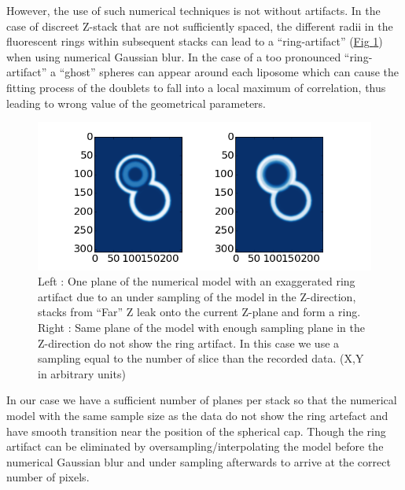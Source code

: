 \documentclass[A4paperpaper,11pt,english]{sphinxmanual}
\begin{document}
However, the use of such numerical techniques is not without artifacts.  In the case of
discreet Z-stack that are not sufficiently spaced, the different radii in the
fluorescent rings within subsequent stacks can lead to a ``ring-artifact'' (\hyperref[index-latex:ring-artifact]{Fig  \ref*{index-latex:ring-artifact}}) when using numerical Gaussian blur. In the case of a too
pronounced ``ring-artifact'' a ``ghost'' spheres can appear around each liposome
which can cause the fitting process of the doublets to fall into a local
maximum of correlation, thus leading to wrong value of the geometrical
parameters.
\begin{figure}[htbp]
\centering
\capstart

\includegraphics[width=0.700\linewidth]{ring_artifact.png}
\caption{Left : One plane of the numerical model with an exaggerated ring artifact due
to an under sampling of the model in the Z-direction, stacks from ``Far'' Z
leak onto the current Z-plane and form a ring.  Right : Same plane of the
model with enough sampling plane in the Z-direction do not show the ring
artifact. In this case we use a sampling equal to the number of slice than
the recorded data. (X,Y in arbitrary units)}\label{index-latex:ring-artifact}\end{figure}

In our case we have a sufficient number of planes per stack so that the numerical model
with the same sample size as the data do not show the ring artefact and have
smooth transition near the position of the spherical cap. Though the ring
artifact can be eliminated by oversampling/interpolating the model before the
numerical Gaussian blur and under sampling afterwards to arrive at the correct number of
pixels.
\end{document}
